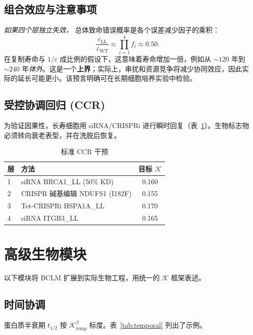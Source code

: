 \documentclass[12pt,a4paper]{article}
\newcommand{\REL}{\mathcal{K}}          %
\begin{document}
	\subsection{组合效应与注意事项}
	\textit{如果四个层独立失效，} 总体致命错误概率是各个误差减少因子的乘积：
	\[
	\frac{\varepsilon_{\mathrm{LL}}}{\varepsilon_{\mathrm{WT}}} \approx \prod_{i=1}^{4} f_i \approx 0.50.
	\]
	在复制寿命与 \(1/\varepsilon\) 成比例的假设下，这意味着寿命增加一倍，例如从 \(\sim 120\) 年到 \(\sim 240\) 年\textit{体外}。这是一个\textbf{上界}；实际上，串扰和资源竞争将减少协同效应，因此实际的延长可能更小。该预言明确可在长期细胞培养实验中检验。
	
	\subsection{受控协调回归 (CCR)}
	为验证因果性，长寿细胞用 siRNA/CRISPRi 进行瞬时回复（表~\ref{tab:CCR}）。生物标志物必须转向衰老表型，并在洗脱后恢复。
	
	\begin{table}[H]
		\centering
		\caption{标准 CCR 干预}
		\label{tab:CCR}
		\begin{tabular}{@{}llc@{}}
			\toprule
			\textbf{层} & \textbf{方法} & \textbf{目标 \(\REL\)} \\
			\midrule
			1 & siRNA BRCA1\_LL (50\% KD) & 0.160 \\
			2 & CRISPR 碱基编辑 NDUFS1 (I182F) & 0.155 \\
			3 & Tet‑CRISPRi HSPA1A\_LL & 0.170 \\
			4 & siRNA ITGB3\_LL & 0.165 \\
			\bottomrule
		\end{tabular}
	\end{table}
	
	\section{高级生物模块}
	\label{sec:modules}
	以下模块将 BCLM 扩展到实际生物工程，用统一的 \(\REL\) 框架表述。
	
	\subsection{时间协调}
	蛋白质半衰期 \(t_{1/2}\) 按 \(\REL_{\mathrm{temp}}^{\beta}\) 标度。表~\ref{tab:temporal} 列出了示例。
	
\end{document}
